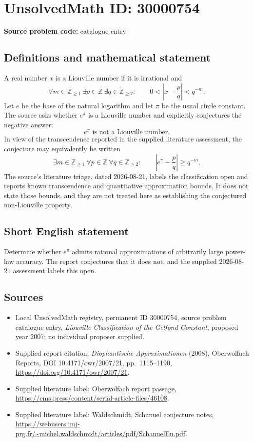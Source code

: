 \documentclass[11pt]{article}
\newcommand{\Z}{\mathbb{Z}}
\begin{document}
\section*{UnsolvedMath ID: 30000754}
\textbf{Source problem code:} catalogue entry
\subsection{Definitions and mathematical statement}
A real number $x$ is a Liouville number if it is irrational and \[\forall m\in\Z_{\geq1}\ \exists p\in\Z\ \exists q\in\Z_{\geq2}:\qquad 0<\left|x-\frac pq\right|<q^{-m}.\] Let $e$ be the base of the natural logarithm and let $\pi$ be the usual circle constant. The source asks whether $e^\pi$ is a Liouville number and explicitly conjectures the negative answer: \[e^\pi\text{ is not a Liouville number}.\] In view of the transcendence reported in the supplied literature assessment, the conjecture may equivalently be written \[\exists m\in\Z_{\geq1}\ \forall p\in\Z\ \forall q\in\Z_{\geq2}:\qquad \left|e^\pi-\frac pq\right|\geq q^{-m}.\] The source's literature triage, dated 2026-08-21, labels the classification open and reports known transcendence and quantitative approximation bounds. It does not state those bounds, and they are not treated here as establishing the conjectured non-Liouville property.
\subsection{Short English statement}
Determine whether $e^\pi$ admits rational approximations of arbitrarily large power-law accuracy. The report conjectures that it does not, and the supplied 2026-08-21 assessment labels this open.
\subsection{Sources}
\begin{itemize}\item Local UnsolvedMath registry, permanent ID 30000754, source problem catalogue entry, \emph{Liouville Classification of the Gelfond Constant}, proposed year 2007; no individual proposer supplied.\item Supplied report citation: \emph{Diophantische Approximationen} (2008), Oberwolfach Reports, DOI 10.4171/owr/2007/21, pp.\ 1115--1190, \url{https://doi.org/10.4171/owr/2007/21}.\item Supplied literature label: Oberwolfach report passage, \url{https://ems.press/content/serial-article-files/46108}.\item Supplied literature label: Waldschmidt, Schanuel conjecture notes, \url{https://webusers.imj-prg.fr/~michel.waldschmidt/articles/pdf/SchanuelEn.pdf}.\end{itemize}
\end{document}

